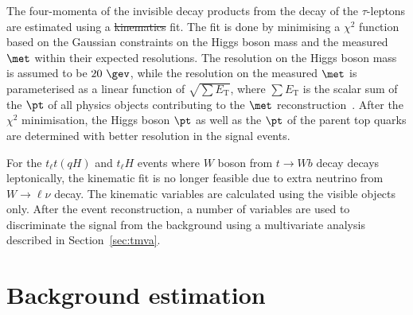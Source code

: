\documentclass[PAPER, coverpage, atlasdraft=true, texlive=2016, UKenglish]{\ATLASLATEXPATH atlasdoc}
\providecommand{\DIFadd}[1]{{\protect\color{blue}\uwave{#1}}} %
\providecommand{\DIFdel}[1]{{\protect\color{red}\sout{#1}}}                      %
\providecommand{\DIFaddbegin}{} %
\providecommand{\DIFaddend}{} %
\providecommand{\DIFdelbegin}{} %
\providecommand{\DIFdelend}{} %
\begin{document}
The four-momenta of the invisible decay products from the decay of the $\tau$-leptons 
are estimated using a \DIFdelbegin \DIFdel{kinematics }\DIFdelend \DIFaddbegin \DIFadd{kinematic }\DIFaddend fit. The fit is done by minimising a $\chi^2$ function based on the Gaussian constraints on the Higgs boson mass and the
measured $\met$ within their expected resolutions. The resolution on the Higgs boson mass is assumed to be $20~\gev$, while the resolution on the measured $\met$ is parameterised as a linear function of 
$\sqrt{\sum E_{\text{T}}}$, where $\sum E_{\text{T}}$ is the scalar sum of the $\pt$ of all physics objects contributing to the $\met$ reconstruction~\cite{Aaboud:2018tkc}.
After the $\chi^2$ minimisation, the Higgs boson $\pt$ as well as the 
$\pt$ of the parent top quarks are determined with better resolution in the signal events. 

For the  $t_{\ell}t(qH)$ and $t_{\ell}H$ events where $W$ boson from $t\to W b$ decay decays leptonically,
the kinematic fit is no longer feasible due to extra neutrino from $W\rightarrow \ell\nu$ decay. The kinematic variables are calculated using the visible
objects only. After the event reconstruction, a number of variables are used to discriminate the signal from the background using a multivariate analysis described
in Section~\ref{sec:tmva}.



\FloatBarrier

\section{Background estimation}
\label{sec:background_model}
\end{document}
